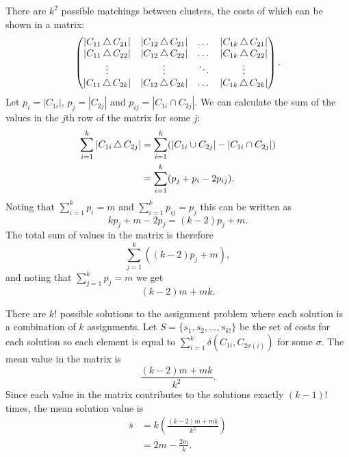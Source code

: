 There are $k^2$ possible matchings between clusters, the costs of which can be
shown in a matrix:
\begin{equation*}
  \begin{pmatrix}
    |C_{11} \operatorname{\bigtriangleup} C_{21}| & |C_{12} \operatorname{\bigtriangleup} C_{21}|
    & \dots & |C_{1k} \operatorname{\bigtriangleup} C_{21}| \\
    |C_{11} \operatorname{\bigtriangleup} C_{22} | & |C_{12} \operatorname{\bigtriangleup} C_{22} |
    & \dots & |C_{1k} \operatorname{\bigtriangleup} C_{22} | \\
    \vdots & \vdots & \ddots & \vdots \\
    |C_{11} \operatorname{\bigtriangleup} C_{2k} | & |C_{12} \operatorname{\bigtriangleup} C_{2k} |
    & \dots & |C_{1k} \operatorname{\bigtriangleup} C_{2k} |
  \end{pmatrix}.
\end{equation*}
Let $p_i = |C_{1i}|$, $p_j = |C_{2j}|$ and $p_{ij} = |C_{1i} \cap C_{2j}|$.
We can calculate the sum of the values in the $j$th row of the matrix for some
$j$:
\begin{align*}
  \sum_{i=1}^{k} |C_{1i} \operatorname{\bigtriangleup} C_{2j}| &= \sum_{i=1}^{k} (|C_{1i} \cup
  C_{2j}| - | C_{1i} \cap C_{2j}|) \\
  &= \sum_{i=1}^{k} (p_j + p_i - 2p_{ij}).
\end{align*}
Noting that $\sum_{i=1}^{k} p_i = m$ and $\sum_{i=1}^{k} p_{ij} = p_j$ this
can be written as
\begin{equation*}
  kp_j + m - 2p_j = (k-2)p_j + m.
\end{equation*}
The total sum of values in the matrix is therefore
\begin{equation*}
  \sum_{j=1}^{k} ((k-2)p_j + m),
\end{equation*}
and noting that $\sum_{j=1}^{k} p_j = m$ we get
\begin{equation*}
  (k-2)m + mk.
\end{equation*}

There are $k!$ possible solutions to the assignment problem where each
solution is a combination of $k$ assignments.  Let $S = \{s_1, s_2, \dotsc,
s_{k!}\}$ be the set of costs for each solution so each element is equal to
$\sum_{i=1}^{k} \delta(C_{1i}, C_{2\sigma(i)})$ for some $\sigma$.  The mean
value in the matrix is
\begin{equation*}
  \frac{(k-2)m + mk}{k^2}.
\end{equation*}
Since each value in the matrix contributes to the solutions exactly $(k-1)!$
times, the mean solution value is
\begin{align*}
  \bar{s} &= k \left( \frac{(k-2)m + mk}{k^2} \right)\\
          &= 2m - \frac{2m}{k}.
\end{align*}


